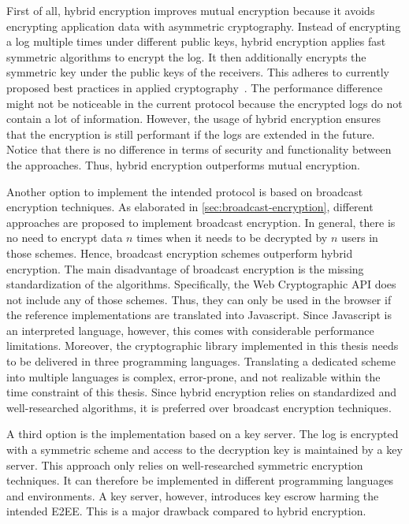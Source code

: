\documentclass[../main.tex]{subfiles}
\begin{document}
First of all, hybrid encryption improves mutual encryption because it avoids encrypting application data with asymmetric cryptography.
Instead of encrypting a log multiple times under different public keys, hybrid encryption applies fast symmetric algorithms to encrypt the log.
It then additionally encrypts the symmetric key under the public keys of the receivers.
This adheres to currently proposed best practices in applied cryptography~\cite[340]{Eckert2018}.
The performance difference might not be noticeable in the current protocol because the encrypted logs do not contain a lot of information.
However, the usage of hybrid encryption ensures that the encryption is still performant if the logs are extended in the future.
Notice that there is no difference in terms of security and functionality between the approaches.
Thus, hybrid encryption outperforms mutual encryption.

Another option to implement the intended protocol is based on broadcast encryption techniques.
As elaborated in \cref{sec:broadcast-encryption}, different approaches are proposed to implement broadcast encryption.
In general, there is no need to encrypt data $n$ times when it needs to be decrypted by $n$ users in those schemes.
Hence, broadcast encryption schemes outperform hybrid encryption.
The main disadvantage of broadcast encryption is the missing standardization of the algorithms.
Specifically, the Web Cryptographic API does not include any of those schemes.
Thus, they can only be used in the browser if the reference implementations are translated into Javascript.
Since Javascript is an interpreted language, however, this comes with considerable performance limitations.
Moreover, the cryptographic library implemented in this thesis needs to be delivered in three programming languages.
Translating a dedicated scheme into multiple languages is complex, error-prone, and not realizable within the time constraint of this thesis.
Since hybrid encryption relies on standardized and well-researched algorithms, it is preferred over broadcast encryption techniques.

A third option is the implementation based on a key server.
The log is encrypted with a symmetric scheme and access to the decryption key is maintained by a key server.
This approach only relies on well-researched symmetric encryption techniques.
It can therefore be implemented in different programming languages and environments.
A key server, however, introduces key escrow harming the intended E2EE.
This is a major drawback compared to hybrid encryption.
\end{document}
